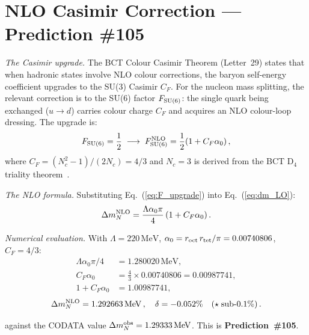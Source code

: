 \documentclass[twocolumn,10pt,a4paper]{article}
\begin{document}
\section{NLO Casimir Correction — Prediction \#105}

\textit{The Casimir upgrade.}\quad
The BCT Colour Casimir Theorem (Letter~29) states that when hadronic states
involve NLO colour corrections, the baryon self-energy coefficient upgrades to
the SU(3) Casimir $C_F$.  For the nucleon mass splitting, the relevant
correction is to the SU(6) factor $F_{\rm SU(6)}$: the single quark being
exchanged ($u \to d$) carries colour charge $C_F$ and acquires an NLO
colour-loop dressing.  The upgrade is:
\begin{equation}
  \label{eq:F_upgrade}
  F_{\rm SU(6)} = \frac{1}{2} \;\longrightarrow\;
  F_{\rm SU(6)}^{\rm NLO} = \frac{1}{2}(1 + C_F\alpha_0)\,,
\end{equation}
where $C_F = (N_c^2-1)/(2N_c) = 4/3$ and $N_c = 3$ is derived from the BCT
D$_4$ triality theorem~\cite{monograph}.

\textit{The NLO formula.}\quad
Substituting Eq.~(\ref{eq:F_upgrade}) into Eq.~(\ref{eq:dm_LO}):
\begin{equation}
  \label{eq:dm_NLO}
  \Delta m_N^{\rm NLO} = \frac{\Lambda\alpha_0\pi}{4}\,(1 + C_F\alpha_0)\,.
\end{equation}

\textit{Numerical evaluation.}\quad
With $\Lambda = 220\,\mathrm{MeV}$,
$\alpha_0 = r_{\rm oct}\,r_{\rm tet}/\pi = 0.00740806$,
$C_F = 4/3$:
\begin{align}
  \Lambda\alpha_0\pi/4 &= 1.280020\,\mathrm{MeV}, \label{eq:LO_num}\\
  C_F\alpha_0           &= \tfrac{4}{3}\times 0.00740806 = 0.00987741,\label{eq:CF_num}\\
  1 + C_F\alpha_0       &= 1.00987741, \label{eq:factor}
\end{align}
\begin{equation}
  \label{eq:result}
  \Delta m_N^{\rm NLO} = 1.292663\,\mathrm{MeV}\,,\quad
  \delta = -0.052\%\quad(\star\;\text{sub-}0.1\%)\,.
\end{equation}

against the CODATA value $\Delta m_N^{\rm obs} = 1.29333\,\mathrm{MeV}$.
This is \textbf{Prediction~\#105}.

\end{document}
